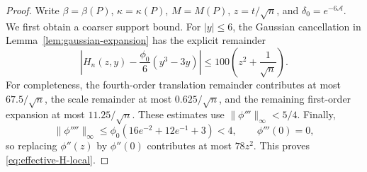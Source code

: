 \documentclass[aop]{imsart}
\theoremstyle{plain}
\theoremstyle{definition}
\theoremstyle{definition}
\begin{document}
\begin{proof}
Write $\beta=\beta(P)$, $\kappa=\kappa(P)$, $M=M(P)$,
$z=t/\sqrt n$, and $\delta_0=e^{-6\mathcal A}$.
We first obtain a coarser support bound.  For $|y|\le6$,
the Gaussian cancellation in Lemma~\ref{lem:gaussian-expansion}
has the explicit remainder
\begin{equation}\label{eq:effective-H-local}
 \left|H_n(z,y)-\frac{\phi_0}{6}(y^3-3y)\right|
 \le100\left(z^2+\frac1{\sqrt n}\right).
\end{equation}
For completeness, the fourth-order translation remainder contributes
at most $67.5/\sqrt n$, the scale remainder at most
$0.625/\sqrt n$, and the remaining first-order expansion at most
$11.25/\sqrt n$.  These estimates use
$\|\phi'''\|_\infty<5/4$.  Finally,
\[
 \|\phi''''\|_\infty
 \le\phi_0(16e^{-2}+12e^{-1}+3)<4,\qquad \phi'''(0)=0,
\]
so replacing $\phi''(z)$ by $\phi''(0)$ contributes at most $78z^2$.
This proves \eqref{eq:effective-H-local}.


\end{proof}
\end{document}

